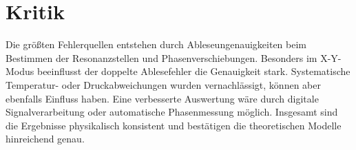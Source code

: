 \section{Kritik}

Die größten Fehlerquellen entstehen durch Ableseungenauigkeiten beim Bestimmen der Resonanzstellen und Phasenverschiebungen. Besonders im X-Y-Modus beeinflusst der doppelte Ablesefehler die Genauigkeit stark. Systematische Temperatur- oder Druckabweichungen wurden vernachlässigt, können aber ebenfalls Einfluss haben. Eine verbesserte Auswertung wäre durch digitale Signalverarbeitung oder automatische Phasenmessung möglich. Insgesamt sind die Ergebnisse physikalisch konsistent und bestätigen die theoretischen Modelle hinreichend genau.